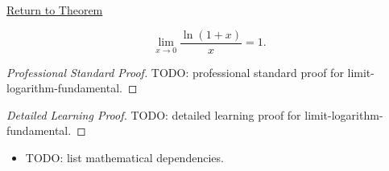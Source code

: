 \newpage
{}
\label{prf:limit-logarithm-fundamental}

\begin{remark*}[Return]
\hyperref[prop:limit-logarithm-fundamental]{Return to Theorem}
\end{remark*}

\begin{proposition*}
\[
  \lim_{x \to 0} \frac{\ln(1+x)}{x} = 1.
\]

\smallskip\noindent
\end{proposition*}

\begin{proof}[Professional Standard Proof]
\LRAProofBodyStart
TODO: professional standard proof for limit-logarithm-fundamental.
\end{proof}

\begin{proof}[Detailed Learning Proof]
\LRAProofBodyStart
TODO: detailed learning proof for limit-logarithm-fundamental.
\end{proof}

\begin{remark*}
\end{remark*}

\begin{dependencies}
\begin{itemize}
  \item TODO: list mathematical dependencies.
\end{itemize}
\end{dependencies}

\clearpage
